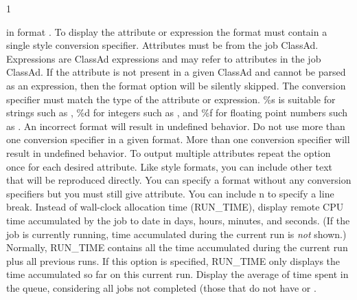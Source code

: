 \begin{ManPage}{\label{man-condor-q}}{1}
\begin{Options}
{    in format .
    To display the attribute or expression the format must contain a single
     style conversion specifier.
    Attributes must be from the job ClassAd.
	Expressions are ClassAd expressions and may 
	refer to attributes in the job ClassAd.
	If the
    attribute is not present in a given ClassAd and cannot
	be parsed as an expression,
    then the format option will be silently skipped.
    The conversion specifier must match the type of the
    attribute or expression.
    \%s is suitable for strings such as ,
    \%d for integers such as ,
    and \%f for floating point numbers such as
    .  An incorrect format
    will result in undefined behavior.
    Do not use more than one conversion specifier in a given
    format.  More than one conversion specifier will result
    in undefined behavior.  To output multiple attributes
    repeat the  option once for each desired
    attribute.
    Like {} style formats, you can include other
    text that will be reproduced directly.   You can specify
    a format without any conversion specifiers but you must
    still give attribute.
    You can include \Bs n to specify a line break. }
   {Instead of wall-clock allocation time (RUN\_TIME), 
    display remote CPU time accumulated by the job to date in days,
    hours, minutes, and seconds.  (If the job is currently running, time
    accumulated during the current run is \emph{not} shown.)}
   {Normally, RUN\_TIME contains all the time
    accumulated during the current run plus all previous runs.  If this
    option is specified, RUN\_TIME only displays the time accumulated so
    far on this current run.}
   {Display the average of time spent in the
    queue, considering all jobs not completed (those that do not have
     or .  }
\end{Options}
\end{ManPage}
